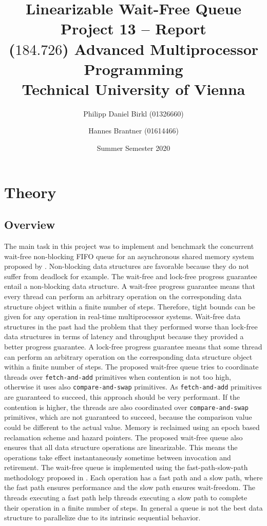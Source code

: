 \documentclass{article}
\title{Linearizable Wait-Free Queue \\ \large Project 13 -- Report \\ \vspace{1em} \small ($184.726$) Advanced Multiprocessor Programming\\Technical University of Vienna}
\author{Philipp Daniel Birkl (01326660) \and Hannes Brantner (01614466)}
\date{Summer Semester 2020}
\begin{document}
\maketitle{}
\section{Theory}
\subsection{Overview}
The main task in this project was to implement and benchmark the concurrent wait-free non-blocking FIFO queue for an asynchronous shared memory system proposed by \cite{WFQ}. Non-blocking data structures are favorable because they do not suffer from deadlock for example. The wait-free and lock-free progress guarantee entail a non-blocking data structure. A wait-free progress guarantee means that every thread can perform an arbitrary operation on the corresponding data structure object within a finite number of steps. Therefore, tight bounds can be given for any operation in real-time multiprocessor systems. Wait-free data structures in the past had the problem that they performed worse than lock-free data structures in terms of latency and throughput because they provided a better progress guarantee. A lock-free progress guarantee means that some thread can perform an arbitrary operation on the corresponding data structure object within a finite number of steps. The proposed wait-free queue tries to coordinate threads over \texttt{fetch-and-add} primitives when contention is not too high, otherwise it uses also \texttt{compare-and-swap} primitives. As \texttt{fetch-and-add} primitives are guaranteed to succeed, this approach should be very performant. If the contention is higher, the threads are also coordinated over \texttt{compare-and-swap} primitives, which are not guaranteed to succeed, because the comparison value could be different to the actual value. Memory is reclaimed using an epoch based reclamation scheme and hazard pointers. The proposed wait-free queue also ensures that all data structure operations are linearizable. This means the operations take effect instantaneously sometime between invocation and retirement. The wait-free queue is implemented using the fast-path-slow-path methodology proposed in \cite{FPSP}. Each operation has a fast path and a slow path, where the fast path ensures performance and the slow path ensures wait-freedom. The threads executing a fast path help threads executing a slow path to complete their operation in a finite number of steps. In general a queue is not the best data structure to parallelize due to its intrinsic sequential behavior. 
\end{document}
